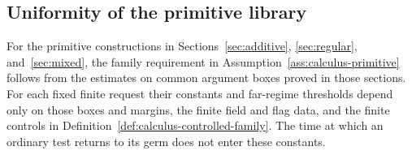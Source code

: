 \subsection{Uniformity of the primitive library}

\begin{proposition}
\label{prop:calculus-library-uniformity}
For the primitive constructions in Sections~\ref{sec:additive},
\ref{sec:regular}, and~\ref{sec:mixed}, the family requirement in
Assumption~\ref{ass:calculus-primitive} follows from the estimates on
common argument boxes proved in those sections.  For each fixed finite
request their constants and far-regime thresholds depend only on those
boxes and margins, the finite field and flag data, and the finite controls
in Definition~\ref{def:calculus-controlled-family}.  The time at which
an ordinary test returns to its germ does not enter these constants.
\end{proposition}

